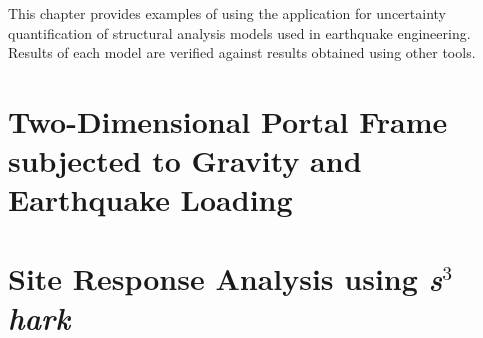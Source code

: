 This chapter provides examples of using the \texttt{\getsoftwarename{}} application for uncertainty
quantification of structural analysis models used in earthquake
engineering. Results of each model are verified against results
obtained using other tools. \cite{federal_emergency_management_agency_fema_hazus_2018-2} \cite{applied_technology_council_atc_fema_2012} \\

\section{Two-Dimensional Portal Frame subjected to Gravity and Earthquake Loading}



\section{Site Response Analysis using \textit{s$^3$hark}}

